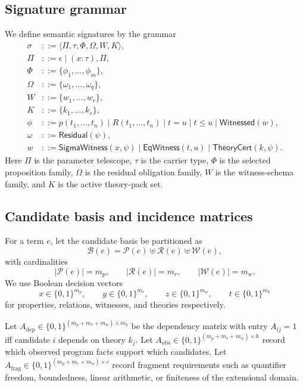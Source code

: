 \documentclass[11pt]{article}
\theoremstyle{definition}
\theoremstyle{plain}
\begin{document}
\subsection{Signature grammar}
We define semantic signatures by the grammar
\begin{align*}
\sigma &::= \langle \Pi, \tau, \Phi, \Omega, W, K \rangle, \\
\Pi &::= \epsilon \mid (x : \tau) , \Pi, \\
\Phi &::= \{\phi_1, \ldots, \phi_m\}, \\
\Omega &::= \{\omega_1, \ldots, \omega_q\}, \\
W &::= \{w_1, \ldots, w_r\}, \\
K &::= \{k_1, \ldots, k_s\}, \\
\phi &::= p(t_1,\ldots,t_n) \mid R(t_1,\ldots,t_n) \mid t = u \mid t \le u \mid \mathsf{Witnessed}(w), \\
\omega &::= \mathsf{Residual}(\psi), \\
w &::= \mathsf{SigmaWitness}(x,\psi) \mid \mathsf{EqWitness}(t,u) \mid \mathsf{TheoryCert}(k,\psi).
\end{align*}
Here $\Pi$ is the parameter telescope, $\tau$ is the carrier type, $\Phi$ is the
selected proposition family, $\Omega$ is the residual obligation family, $W$ is
the witness-schema family, and $K$ is the active theory-pack set.

\subsection{Candidate basis and incidence matrices}
For a term $e$, let the candidate basis be partitioned as
\[
\mathcal{B}(e) = \mathcal{P}(e) \uplus \mathcal{R}(e) \uplus \mathcal{W}(e),
\]
with cardinalities
\[
|\mathcal{P}(e)| = m_p, \qquad |\mathcal{R}(e)| = m_r, \qquad |\mathcal{W}(e)| = m_w.
\]
We use Boolean decision vectors
\[
x \in \{0,1\}^{m_p}, \qquad y \in \{0,1\}^{m_r}, \qquad z \in \{0,1\}^{m_w}, \qquad t \in \{0,1\}^{m_k}
\]
for properties, relations, witnesses, and theories respectively.

Let $A_{\mathrm{dep}} \in \{0,1\}^{(m_p + m_r + m_w) \times m_k}$ be the
dependency matrix with entry $A_{ij}=1$ iff candidate $i$ depends on theory
$k_j$. Let $A_{\mathrm{obs}} \in \{0,1\}^{(m_p + m_r + m_w) \times h}$ record
which observed program facts support which candidates. Let
$A_{\mathrm{frag}} \in \{0,1\}^{(m_p + m_r + m_w) \times c}$ record fragment
requirements such as quantifier freedom, boundedness, linear arithmetic, or
finiteness of the extensional domain.
\end{document}
